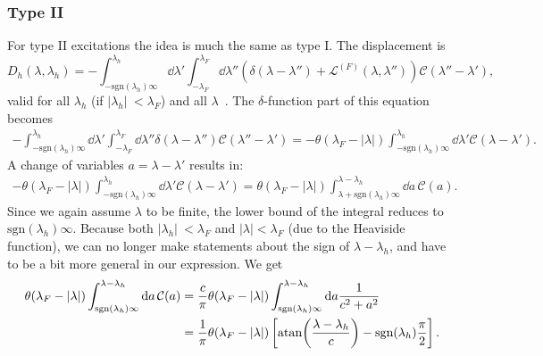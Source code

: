 \documentclass[11pt, a4paper]{report} %
\newcommand{\inversetruncc}{\mathcal{L}}
\newcommand{\kernel}{\mathcal{C}}
\begin{document}
\subsubsection{Type II}
For type II excitations the idea is much the same as type I. The displacement is
\begin{equation}
	D_h(\lambda, \lambda_h) = - \int_{-\textrm{sgn}(\lambda_h)\infty}^{\lambda_h} \dd \lambda' \int_{-\lambda_F}^{\lambda_F} \dd \lambda'' \left(\delta(\lambda-\lambda'') + \inversetruncc^{(F)}(\lambda,\lambda'') \right)\kernel(\lambda''-\lambda'),
\end{equation}
valid for all \(\lambda_h\) (if \(\lvert \lambda_h \rvert\ < \lambda_F\)) and all \(\lambda\)~\cite{tofind}.
The \(\delta\)-function part of this equation becomes
\begin{align}
	-\int_{-\textrm{sgn}(\lambda_h)\infty}^{\lambda_h} \dd \lambda' \int_{-\lambda_F}^{\lambda_F} \dd \lambda'' \delta(\lambda-\lambda'') \kernel(\lambda''-\lambda') 
		= - \theta(\lambda_F - \lvert \lambda \rvert) \int_{-\textrm{sgn}(\lambda_h)\infty}^{\lambda_h} \dd \lambda'     \kernel(\lambda-\lambda').
\end{align}
A change of variables \(a=\lambda-\lambda'\) results in:
\begin{align}
	 - \theta(\lambda_F - \lvert \lambda \rvert) \int_{-\textrm{sgn}(\lambda_h)\infty}^{\lambda_h} \dd \lambda'     \kernel(\lambda-\lambda') = 
	  \theta(\lambda_F - \lvert \lambda \rvert) \int_{\lambda+\textrm{sgn}(\lambda_h)\infty}^{\lambda-\lambda_h} \dd a \, \kernel(a).
\end{align}
Since we again assume \(\lambda\) to be finite, the lower bound of the integral reduces to \(\textrm{sgn}(\lambda_h)\infty\).
Because both \({\lvert \lambda_h \rvert\ < \lambda_F}\) and \({\lvert\lambda\rvert < \lambda_F}\) (due to the Heaviside function), we can no longer make statements about the sign of \(\lambda-\lambda_h\), and have to be a bit more general in our expression.
We get
\begin{align}
	  \theta(\lambda_F - \lvert \lambda \rvert) \int_{\textrm{sgn}(\lambda_h)\infty}^{\lambda-\lambda_h} \dd a \, \kernel(a) &=
	  \frac{c}{\pi}\theta(\lambda_F - \lvert \lambda \rvert) \int_{\textrm{sgn}(\lambda_h)\infty}^{\lambda-\lambda_h} \dd a \frac{1}{c^2 + a^2}\\
	  &= \frac{1}{\pi}\theta(\lambda_F - \lvert \lambda \rvert) \left[ \atan(\frac{\lambda-\lambda_h}{c}) - \textrm{sgn}(\lambda_h)\frac{\pi}{2}\right].
\end{align}
\end{document}
